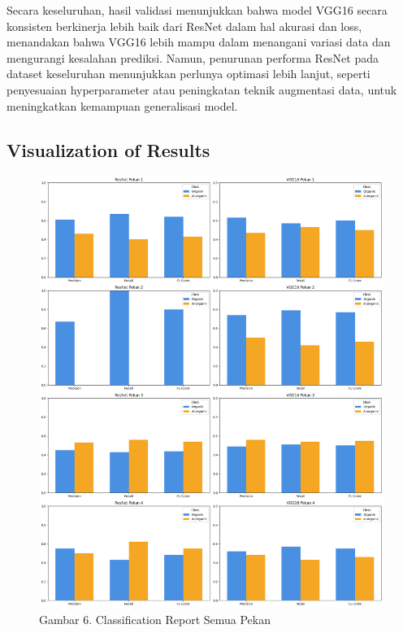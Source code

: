 \documentclass[12pt,a4paper]{article}
\begin{document}
Secara keseluruhan, hasil validasi menunjukkan bahwa model VGG16 secara konsisten berkinerja lebih baik dari ResNet dalam hal akurasi dan loss, menandakan bahwa VGG16 lebih mampu dalam menangani variasi data dan mengurangi kesalahan prediksi. Namun, penurunan performa ResNet pada dataset keseluruhan menunjukkan perlunya optimasi lebih lanjut, seperti penyesuaian hyperparameter atau peningkatan teknik augmentasi data, untuk meningkatkan kemampuan generalisasi model.


\subsection{Visualization of Results}
\begin{adjustwidth}{3em}{0pt}

\begin{figure}[H]
    \centering
    \includegraphics[width=1\linewidth]{Images/classificationreport.png}
    \caption*{Gambar 6. Classification Report Semua Pekan}
    \label{fig:dataset_collection}
\end{figure}


\end{adjustwidth}
\end{document}
